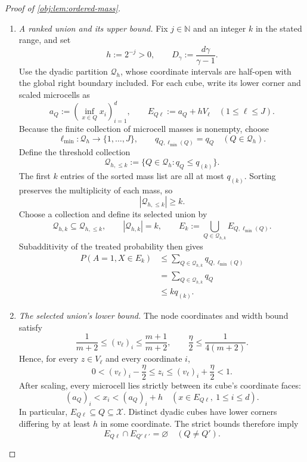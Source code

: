 \begin{proof}[Proof of \cref{obj:lem:ordered-mass}]
\begin{enumerate}
Combining these bounds, using \(F_E\ge0\) and \(s_E\le1\), proves
\[
\begin{aligned}
\frac{\gamma-1}{\gamma}\,
C^{-1/(\gamma-1)}u^{\gamma/(\gamma-1)}
&\le \int_0^{s_E}F_E(t)\,dt\\
&\le \int_0^1F_E(t)\,dt\\
&=P(A=1,X\in E).
\end{aligned}
\]

\item \emph{A ranked union and its upper bound.}
Fix \(j\in\mathbb N\) and an integer \(k\) in the stated range, and set
\[
h:=2^{-j}>0,
\qquad
D_\gamma:=\frac{d\gamma}{\gamma-1}.
\]
Use the dyadic partition \(\mathcal Q_h\), whose coordinate intervals are half-open with the global right boundary included. For each cube, write its lower corner and scaled microcells as
\[
a_Q:=\left(\inf_{x\in Q}x_i\right)_{i=1}^d,
\qquad
E_{Q\ell}:=a_Q+hV_\ell
\quad(1\le\ell\le J).
\]
Because the finite collection of microcell masses is nonempty, choose
\[
\ell_{\min}:\mathcal Q_h\longrightarrow\{1,\ldots,J\},
\qquad
q_{Q,\ell_{\min}(Q)}=q_Q
\quad(Q\in\mathcal Q_h).
\]
Define the threshold collection
\[
\mathcal Q_{h,\le k}
:=
\{Q\in\mathcal Q_h:q_Q\le q_{(k)}\}.
\]
The first \(k\) entries of the sorted mass list are all at most \(q_{(k)}\). Sorting preserves the multiplicity of each mass, so
\[
|\mathcal Q_{h,\le k}|\ge k.
\]
Choose a collection and define its selected union by
\[
\mathcal Q_{h,k}\subseteq\mathcal Q_{h,\le k},
\qquad
|\mathcal Q_{h,k}|=k,
\qquad
E_k:=\bigcup_{Q\in\mathcal Q_{h,k}}E_{Q,\ell_{\min}(Q)}.
\]
Subadditivity of the treated probability then gives
\[
\begin{aligned}
P(A=1,X\in E_k)
&\le
\sum_{Q\in\mathcal Q_{h,k}}
q_{Q,\ell_{\min}(Q)}\\
&=
\sum_{Q\in\mathcal Q_{h,k}}q_Q\\
&\le kq_{(k)}.
\end{aligned}
\]

\item \emph{The selected union's lower bound.}
The node coordinates and width bound satisfy
\[
\frac1{m+2}\le(v_\ell)_i\le\frac{m+1}{m+2},
\qquad
\frac\eta2\le\frac1{4(m+2)}.
\]
Hence, for every \(z\in V_\ell\) and every coordinate \(i\),
\[
0<(v_\ell)_i-\frac\eta2
\le z_i
\le(v_\ell)_i+\frac\eta2<1.
\]
After scaling, every microcell lies strictly between its cube's coordinate faces:
\[
(a_Q)_i<x_i<(a_Q)_i+h
\quad(x\in E_{Q\ell},\ 1\le i\le d).
\]
In particular, \(E_{Q\ell}\subseteq Q\subseteq\mathcal X\). Distinct dyadic cubes have lower corners differing by at least \(h\) in some coordinate. The strict bounds therefore imply
\[
E_{Q\ell}\cap E_{Q'\ell'}=\varnothing
\quad(Q\ne Q').
\]


\end{enumerate}
\end{proof}
